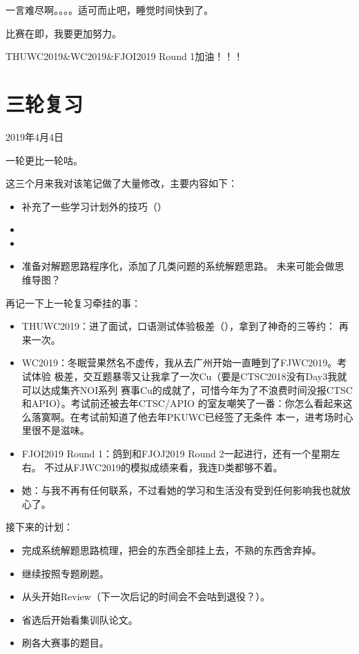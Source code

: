 一言难尽啊。。。。适可而止吧，睡觉时间快到了。

比赛在即，我要更加努力。

THUWC2019\&WC2019\&FJOI2019 Round 1加油！！！

\section{三轮复习}
2019年4月4日

一轮更比一轮咕。

这三个月来我对该笔记做了大量修改，主要内容如下：

\begin{itemize}
    \item 补充了一些学习计划外的技巧（）
    \item {}
    \item {}
    \item 准备对解题思路程序化，添加了几类问题的系统解题思路。
    未来可能会做思维导图？
\end{itemize}

再记一下上一轮复习牵挂的事：

\begin{itemize}
    \item THUWC2019：进了面试，口语测试体验极差（），拿到了神奇的三等约：
    再来一次。
    \item WC2019：冬眠营果然名不虚传，我从去广州开始一直睡到了FJWC2019。考试体验
    极差，交互题暴零又让我拿了一次Cu（要是CTSC2018没有Day3我就可以达成集齐NOI系列
    赛事Cu的成就了，可惜今年为了不浪费时间没报CTSC和APIO）。考试前还被去年CTSC/APIO
    的室友嘲笑了一番：你怎么看起来这么落寞啊。在考试前知道了他去年PKUWC已经签了无条件
    本一，进考场时心里很不是滋味。
    \item FJOI2019 Round 1：鸽到和FJOJ2019 Round 2一起进行，还有一个星期左右。
    不过从FJWC2019的模拟成绩来看，我连D类都够不着。
    \item 她：与我不再有任何联系，不过看她的学习和生活没有受到任何影响我也就放心了。
\end{itemize}

接下来的计划：
\begin{itemize}
    \item 完成系统解题思路梳理，把会的东西全部挂上去，不熟的东西舍弃掉。
    \item 继续按照专题刷题。
    \item 从头开始Review（下一次后记的时间会不会咕到退役？）。
    \item 省选后开始看集训队论文。
    \item 刷各大赛事的题目。
\end{itemize}

